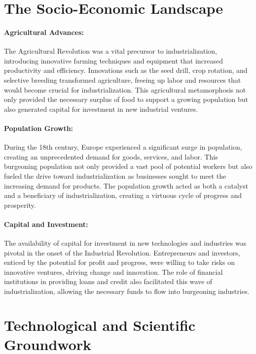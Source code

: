 \documentclass[a4paper,12pt]{book}
\begin{document}
\section*{The Socio-Economic Landscape}

\paragraph{Agricultural Advances:}
The Agricultural Revolution was a vital precursor to industrialization, introducing innovative farming techniques and equipment that increased productivity and efficiency. Innovations such as the seed drill, crop rotation, and selective breeding transformed agriculture, freeing up labor and resources that would become crucial for industrialization. This agricultural metamorphosis not only provided the necessary surplus of food to support a growing population but also generated capital for investment in new industrial ventures.

\paragraph{Population Growth:}
During the 18th century, Europe experienced a significant surge in population, creating an unprecedented demand for goods, services, and labor. This burgeoning population not only provided a vast pool of potential workers but also fueled the drive toward industrialization as businesses sought to meet the increasing demand for products. The population growth acted as both a catalyst and a beneficiary of industrialization, creating a virtuous cycle of progress and prosperity.

\paragraph{Capital and Investment:}
The availability of capital for investment in new technologies and industries was pivotal in the onset of the Industrial Revolution. Entrepreneurs and investors, enticed by the potential for profit and progress, were willing to take risks on innovative ventures, driving change and innovation. The role of financial institutions in providing loans and credit also facilitated this wave of industrialization, allowing the necessary funds to flow into burgeoning industries.

\section*{Technological and Scientific Groundwork}
\end{document}

